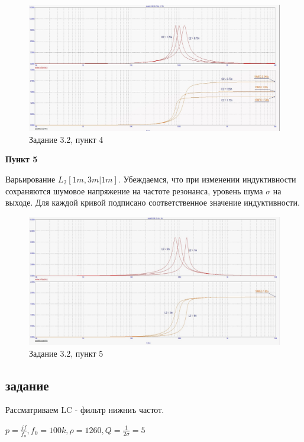 \documentclass[a4paper, 14pt]{extarticle}%
\begin{document}
\begin{figure}[h!]
			\centering
			\includegraphics[width=1.1\linewidth]{3/3_2_3.jpg}
			\caption{Задание 3.2, пункт 4}
			\label{A}
\end{figure}


\textbf{Пункт 5}


Варьирование $L_2[1m, 3m | 1m]$.
Убеждаемся, что при изменении индуктивности сохраняются шумовое напряжение на частоте резонанса, уровень шума $\sigma$ на выходе. Для каждой кривой подписано соответственное значение индуктивности.

\begin{figure}[h!]
			\centering
			\includegraphics[width=1.1\linewidth]{3/3_2_4.jpg}
			\caption{Задание 3.2, пункт 5}
			\label{A}
\end{figure}

\subsection{задание}

Рассматриваем LC - фильтр нижниъ частот.

$p = \frac{jf}{f_o}, f_0 = 100k, \rho = 1260, Q = \frac{1}{2\sigma} = 5$
\end{document}
